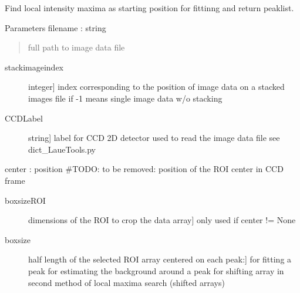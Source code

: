 \documentclass[letterpaper,10pt,english]{sphinxmanual}
\begin{document}
\begin{fulllineitems}
\label{\detokenize{PeakSearch:LaueTools.readmccd.PeakSearch}}
Find local intensity maxima as starting position for fittinng and return peaklist.

Parameters
filename : string
\begin{quote}

full path to image data file
\end{quote}
\begin{description}
\item[{stackimageindex}] \leavevmode{[}integer{]}
index corresponding to the position of image data on a stacked images file
if -1  means single image data w/o stacking

\item[{CCDLabel}] \leavevmode{[}string{]}
label for CCD 2D detector used to read the image data file see dict\_LaueTools.py

\end{description}

center : position \#TODO: to be removed: position of the ROI center in CCD frame
\begin{description}
\item[{boxsizeROI}] \leavevmode{[}dimensions of the ROI to crop the data array{]}
only used if center != None

\item[{boxsize}] \leavevmode{[}half length of the selected ROI array centered on each peak:{]}
for fitting a peak
for estimating the background around a peak
for shifting array in second method of local maxima search (shifted arrays)


\end{description}
\end{fulllineitems}
\end{document}
